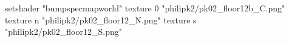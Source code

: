 setshader "bumpspecmapworld"
    texture 0 "philipk2/pk02_floor12b_C.png"
    texture n "philipk2/pk02_floor12_N.png"
    texture s "philipk2/pk02_floor12_S.png"
